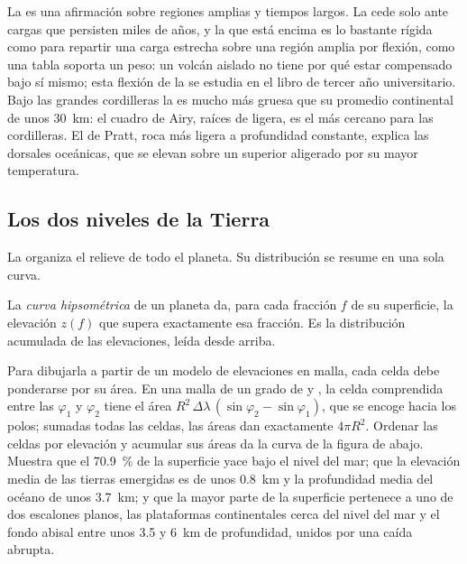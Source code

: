 La  es una afirmación sobre regiones amplias y tiempos largos. La  cede solo ante cargas que persisten miles de
años, y la  que está encima es lo bastante rígida como para repartir una carga estrecha sobre una región amplia por flexión,
como una tabla soporta un peso: un volcán aislado no tiene por qué estar compensado bajo sí mismo; esta flexión de la  se
estudia en el libro de tercer año universitario. Bajo las grandes cordilleras la  es mucho más gruesa que su promedio
continental de unos \qty{30}{km}: el cuadro de Airy, raíces de  ligera, es el más cercano para las cordilleras. El de Pratt,
roca más ligera a profundidad constante, explica las dorsales oceánicas, que se elevan sobre un  superior aligerado por su mayor
temperatura.

\subsection*{Los dos niveles de la Tierra}

La  organiza el relieve de todo el planeta. Su distribución se resume en una sola curva.

\begin{definition}\label{def:b1:isostasy-gravity:hypsometry}
La \emph{curva hipsométrica} de un planeta da, para cada fracción $f$ de su superficie, la elevación
$z(f)$ que supera exactamente esa fracción. Es la distribución acumulada de las elevaciones, leída desde arriba.
\end{definition}

Para dibujarla a partir de un modelo de elevaciones en malla, cada celda debe ponderarse por su área. En una malla de un grado de
 y , la celda comprendida entre las  $\varphi_1$ y $\varphi_2$ tiene el área
$R^2\,\Delta\lambda\,(\sin\varphi_2 - \sin\varphi_1)$, que se encoge hacia los polos; sumadas todas las celdas, las áreas dan
exactamente $4\pi R^2$. Ordenar las celdas por elevación y acumular sus áreas da la curva de la figura de abajo. Muestra que el
\qty{70.9}{\percent} de la superficie yace bajo el nivel del mar; que la elevación media de las tierras emergidas es de unos
\qty{0.8}{km} y la profundidad media del océano de unos \qty{3.7}{km}; y que la mayor parte de la superficie pertenece a uno de dos
escalones planos, las plataformas continentales cerca del nivel del mar y el fondo abisal entre unos 3.5 y \qty{6}{km} de
profundidad, unidos por una caída abrupta.

